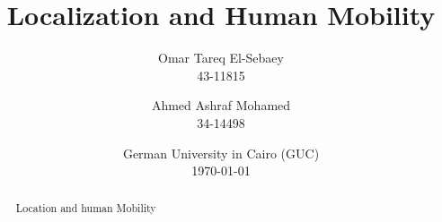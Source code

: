 \documentclass[11pt, a4paper]{report}
\title{Localization and Human Mobility}
\author{Omar Tareq El-Sebaey \\ 43-11815 \and Ahmed Ashraf Mohamed \\ 34-14498}
\date{German University in Cairo (GUC) \\ \today}
\begin{document}
    \begin{titlepage}
        \maketitle
        \begin{abstract}
            Location and human Mobility
        \end{abstract}
        \tableofcontents
    \end{titlepage}
\end{document}
